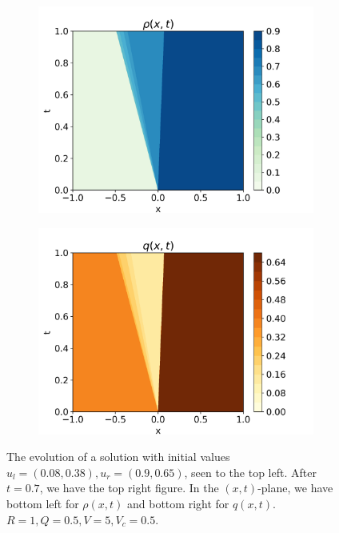 \documentclass[10pt]{article}
\numberwithin{equation}{section}
\begin{document}
\begin{figure}[H]
\begin{subfigure}[b]{0.35\textwidth}
         \includegraphics[width=\textwidth]{Figures/Model/Plots/Sys3bRho.png}
     \end{subfigure}
     \begin{subfigure}[b]{0.35\textwidth}
         \centering
         \includegraphics[width=\textwidth]{Figures/Model/Plots/Sys3bQ.png}
     \end{subfigure}
        \caption{The evolution of a solution with initial values $u_l = (0.08, 0.38 ), u_r = (0.9, 0.65)$, seen to the top left. After $t = 0.7$, we have the top right figure. In the $(x,t)$-plane, we have bottom left for $\rho(x,t)$ and bottom right for $q(x,t)$. $R = 1, Q = 0.5, V = 5, V_c = 0.5$.}
        \label{fig:Example3b}
\end{figure}
\end{document}
